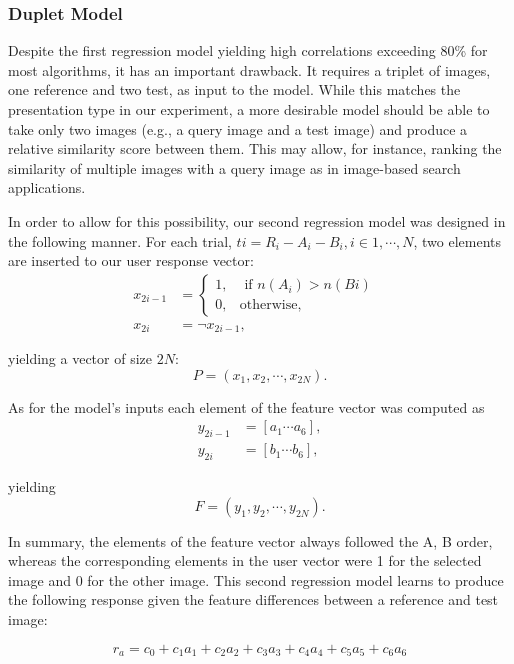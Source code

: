 \subsubsection{Duplet Model}
Despite the first regression model yielding high correlations exceeding 80\% for most algorithms, it has an important drawback. It requires a triplet of images, one reference and two test, as input to the model. While this matches the presentation type in our experiment, a more desirable model should be able to take only two images (e.g., a query image and a test image) and produce a relative similarity score between them. This may allow, for instance, ranking the similarity of multiple images with a query image as in image-based search applications.

In order to allow for this possibility, our second regression model was designed in the following manner.
For each trial, $ti = R_i - A_i - B_i, i \in {1, \cdots , N}$, two elements are inserted to our user response vector:
\begin{align}
    x_{2i-1} &= \begin{cases} 
    1, &\text{ if $n(A_i) > n(Bi)$ } \\
    0, &\text{otherwise},
    \end{cases}\\
    x_{2i} &= \neg  x_{2i-1},
\end{align}
    

yielding a vector of size $2N$:
\begin{equation}
   P = (x_1, x_2,\cdots, x_{2N} ). 
\end{equation}

As for the model’s inputs each element of the feature vector was computed as
\begin{align}
    y_{2i-1} &= [a_1 \cdots a_6], \\
    y_{2i} &= [b_1 \cdots b_6], 
\end{align}


yielding
\begin{equation}
    F = (y_1, y_2, \cdots , y_{2N} ).
\end{equation}

In summary, the elements of the feature vector always followed the A, B order, whereas the corresponding elements in the user vector were 1 for the selected image and 0 for the other image. This second regression model learns to produce the following response given the feature differences between a reference and test image:

\begin{equation}
\label{eq:log_regression}
    r_a = c_0 + c_1a_1 + c_2a_2 + c_3a_3 + c_4a_4 + c_5a_5 + c_6a_6 
\end{equation}

